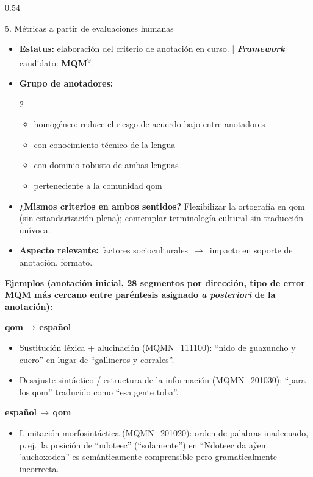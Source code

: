 \documentclass[final]{beamer}
\newcommand{\cita}[2][tudBlue]{\textsuperscript{\color{#1}#2}}
\begin{document}
\begin{frame}[t]
\begin{columns}[t,onlytextwidth]
\begin{column}{0.54\textwidth}
  \begin{pblock}{5. Métricas a partir de evaluaciones humanas}
    \begin{itemize}
      \item \textbf{Estatus:} elaboración del criterio de anotación en curso. | \textbf{\textit{Framework}} candidato: \textbf{MQM}\cita{9}.
      \item \textbf{Grupo de anotadores:}
      {
       \setlength{\multicolsep}{0pt}
       \begin{multicols}{2}
         \begin{itemize}
           \item homogéneo: reduce el riesgo de acuerdo bajo entre anotadores
           \item con conocimiento técnico de la lengua
           \item con dominio robusto de ambas lenguas
           \item perteneciente a la comunidad qom
         \end{itemize}
       \end{multicols}
      }
      \item \textbf{¿Mismos criterios en ambos sentidos?} Flexibilizar la ortografía en qom (sin estandarización plena); contemplar terminología cultural sin traducción unívoca.
      \item \textbf{Aspecto relevante:} factores socioculturales \,$\rightarrow$\, impacto en soporte de anotación, formato.
    \end{itemize}
    \vspace{0.2cm}
    {\bfseries Ejemplos (anotación inicial, 28 segmentos por dirección, tipo de error MQM más cercano entre paréntesis asignado \underline{\textit{a posteriori}} de la anotación):}
    \begin{pinner}
      \small
      \textbf{qom\,$\rightarrow$\,español}
      \begin{itemize}
        \item Sustitución léxica + alucinación (MQMN\_111100): ``nido de guazuncho y cuero'' en lugar de ``gallineros y corrales''.
        \item Desajuste sintáctico / estructura de la información (MQMN\_201030): ``para los qom'' traducido como ``esa gente toba''.
      \end{itemize}
      \textbf{español\,$\rightarrow$\,qom}
      \begin{itemize}
        \item Limitación morfosintáctica (MQMN\_201020): orden de palabras inadecuado, p.\,ej.\ la posición de ``ndoteec'' (``solamente'') en ``Ndoteec da a\~{y}em 'auchoxoden'' es semánticamente comprensible pero gramaticalmente incorrecta.
      \end{itemize}
    \end{pinner}
  \end{pblock}


\end{column}
\end{columns}
\end{frame}
\end{document}
